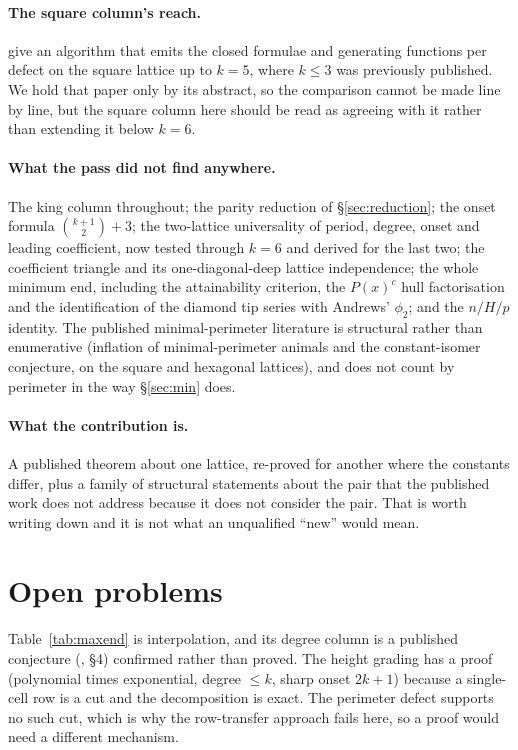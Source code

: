 \documentclass[11pt]{article}
\begin{document}
\paragraph{The square column's reach.} \cite{barequetmagal2023}
give an algorithm that emits the closed formulae and generating functions per
defect on the square lattice up to $k = 5$, where $k \le 3$ was previously
published. We hold that paper only by its abstract, so the comparison cannot be
made line by line, but the square column here should be read as agreeing with
it rather than extending it below $k = 6$.

\paragraph{What the pass did not find anywhere.} The king column throughout; the
parity reduction of \S\ref{sec:reduction}; the onset formula
$\binom{k+1}{2} + 3$; the two-lattice universality of period, degree, onset and
leading coefficient, now tested through $k = 6$ and derived for the last two;
the
coefficient triangle and its one-diagonal-deep lattice independence; the whole
minimum end, including the attainability criterion, the $P(x)^c$ hull
factorisation and the identification of the diamond tip series with Andrews'
$\phi_2$; and the $n/H/p$ identity. The published minimal-perimeter literature
is structural rather than enumerative (inflation of minimal-perimeter animals
and the constant-isomer conjecture, on the square and hexagonal lattices), and
does not count by perimeter in the way \S\ref{sec:min} does.

\paragraph{What the contribution is.} A published theorem about one
lattice, re-proved for another where the constants differ, plus a family of
structural statements about the pair that the published work does not address
because it does not consider the pair. That is worth writing down and it is not
what an unqualified ``new'' would mean.

\section{Open problems}

\begin{openproblem}
Table~\ref{tab:maxend} is interpolation, and its degree column is a published
conjecture (\cite{abz2018}, \S4) confirmed rather than proved. The height
grading has a proof
(polynomial times exponential, degree $\le k$, sharp onset $2k+1$) because a
single-cell row is a cut and the decomposition is exact. The perimeter defect
supports no such cut, which is why the row-transfer approach fails here, so a
proof would need a different mechanism.
\end{openproblem}
\end{document}

